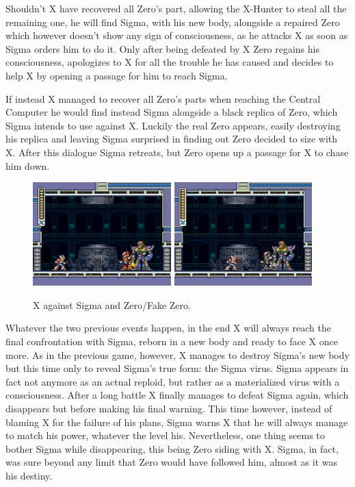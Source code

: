 Shouldn't X have recovered all Zero's part, allowing the X-Hunter to steal all the remaining one, he will find Sigma, with his new body, alongside a repaired Zero which however doesn't show any sign of consciousness, as he attacks X as soon as Sigma orders him to do it. Only after being defeated by X Zero regains his consciousness, apologizes to X for all the trouble he has caused and decides to help X by opening a passage for him to reach Sigma.

If instead X managed to recover all Zero's parts when reaching the Central Computer he would find instead Sigma alongside a black replica of Zero, which Sigma intends to use against X. Luckily the real Zero appears, easily destroying his replica and leaving Sigma surprised in finding out Zero decided to size with X. After this dialogue Sigma retreats, but Zero opens up a passage for X to chase him down.

\begin{figure}[htp]
	\centering
	\includegraphics[height=4cm]{figures/X2/story_3_2.jpg}
	\includegraphics[height=4cm]{figures/X2/story_3.jpg}
	\caption{X against Sigma and Zero/Fake Zero.}
\end{figure}

Whatever the two previous events happen, in the end X will always reach the final confrontation with Sigma, reborn in a new body and ready to face X once more. As in the previous game, however, X manages to destroy Sigma's new body but this time only to reveal Sigma's true form: the Sigma virus. Sigma appears in fact not anymore as an actual reploid, but rather as a materialized virus with a consciousness. After a long battle X finally manages to defeat Sigma again, which disappears but before making his final warning. This time however, instead of blaming X for the failure of his plans, Sigma warns X that he will always manage to match his power, whatever the level his. Nevertheless, one thing seems to bother Sigma while disappearing, this being Zero siding with X. Sigma, in fact, was sure beyond any limit that Zero would have followed him, almost as it was his destiny.

